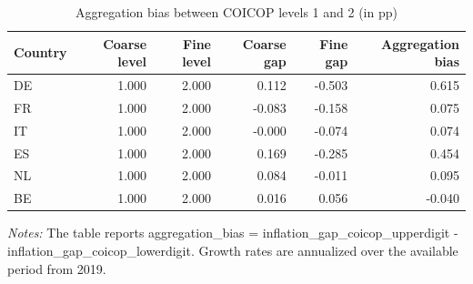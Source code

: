 \begin{table}[H]
\centering
\caption{Aggregation bias between COICOP levels 1 and 2 (in pp)}
\label{tab:aggregation-bias-level1-level2-six-countries}
\begin{tabular}{lrrrrr}
\toprule
Country & Coarse level & Fine level & Coarse gap & Fine gap & Aggregation bias \\
\midrule
DE & 1.000 & 2.000 & 0.112 & -0.503 & 0.615 \\
FR & 1.000 & 2.000 & -0.083 & -0.158 & 0.075 \\
IT & 1.000 & 2.000 & -0.000 & -0.074 & 0.074 \\
ES & 1.000 & 2.000 & 0.169 & -0.285 & 0.454 \\
NL & 1.000 & 2.000 & 0.084 & -0.011 & 0.095 \\
BE & 1.000 & 2.000 & 0.016 & 0.056 & -0.040 \\
\bottomrule
\end{tabular}
\begin{flushleft}
\footnotesize{\emph{Notes:} The table reports aggregation\_bias = inflation\_gap\_coicop\_upperdigit - inflation\_gap\_coicop\_lowerdigit. Growth rates are annualized over the available period from 2019.}
\end{flushleft}
\end{table}
